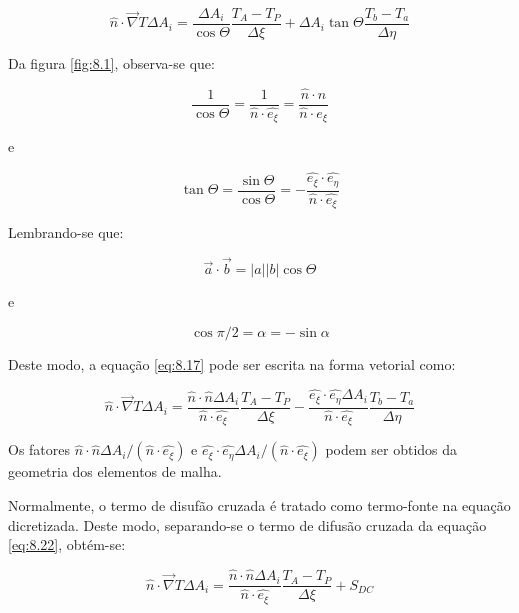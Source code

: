 \begin{equation}
    \label{eq:8.17}
    \hat{n} \cdot \vec{\nabla}T \Delta A_i = \frac{\Delta A_i}{\cos{\Theta}} \frac{T_A - T_P}{\Delta \xi} + \Delta A_i \tan{\Theta} \frac{T_b - T_a}{\Delta \eta}
\end{equation}

Da figura \ref{fig:8.1}, observa-se que:

\begin{equation}
    \label{eq:8.18}
    \frac{1}{\cos \Theta} = \frac{1}{\hat{n}\cdot \hat{e_\xi}} = \frac{\hat{n} \cdot \hat{n}}{\hat{n} \cdot \hat{e_\xi}}
\end{equation}

e

\begin{equation}
    \label{eq:8.19}
    \tan{\Theta} = \frac{\sin{\Theta}}{\cos{\Theta}} = - \frac{\hat{e_\xi} \cdot \hat{e_\eta}}{\hat{n} \cdot \hat{e_\xi}}
\end{equation}

Lembrando-se que:

\begin{equation}
    \label{eq:8.20}
    \vec{a} \cdot \vec{b} = |a| |b| \cos{\Theta}
\end{equation}

e

\begin{equation}
    \label{eq:8.21}
    \cos{\pi / 2 = \alpha} = - \sin{\alpha}
\end{equation}

Deste modo, a equação \ref{eq:8.17} pode ser escrita na forma vetorial como:

\begin{equation}
    \label{eq:8.22}
    \hat{n} \cdot \vec{\nabla} T \Delta A_i = \frac{\hat{n} \cdot \hat{n} \Delta A_i}{\hat{n} \cdot \hat{e_\xi}} \frac{T_A - T_P}{\Delta \xi} - \frac{\hat{e_\xi} \cdot \hat{e_\eta} \Delta A_i}{\hat{n} \cdot \hat{e_\xi}} \frac{T_b - T_a}{\Delta \eta}
\end{equation}

Os fatores $\hat{n} \cdot \hat{n} \Delta A_i / (\hat{n} \cdot \hat{e_\xi})$ e $\hat{e_\xi} \cdot \hat{e_\eta} \Delta A_i / (\hat{n} \cdot \hat{e_\xi})$ podem ser obtidos da geometria dos elementos de malha.

Normalmente, o termo de disufão cruzada é tratado como termo-fonte na equação dicretizada. Deste modo, separando-se o termo de difusão cruzada da equação \ref{eq:8.22}, obtém-se:

\begin{equation}
    \label{eq:8.23}
    \hat{n} \cdot \vec{\nabla}T \Delta A_i = \frac{\hat{n} \cdot \hat{n} \Delta A_i}{\hat{n} \cdot \hat{e_\xi}} \frac{T_A - T_P}{\Delta \xi} + S_{DC}
\end{equation}

